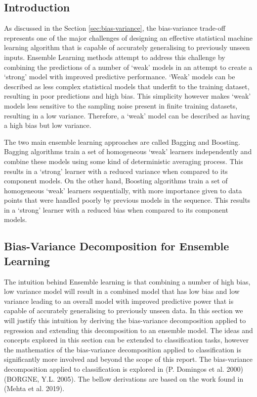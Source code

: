 \documentclass[../SMLreport_template.tex]{subfiles}
\begin{document}
\subsection{Introduction}
As discussed in the Section \ref{sec:bias-variance}, the bias-variance trade-off represents one of the major challenges of designing an effective statistical machine learning algorithm that is capable of accurately generalising to previously unseen inputs. Ensemble Learning methods attempt to address this challenge by combining the predictions of a number of ‘weak’ models in an attempt to create a ‘strong’ model with improved predictive performance. ‘Weak’ models can be described as less complex statistical models that underfit to the training dataset, resulting in poor predictions and high bias. This simplicity however makes ‘weak’ models less sensitive to the sampling noise present in finite training datasets, resulting in a low variance. Therefore, a ‘weak’ model can be described as having a high bias but low variance. \par\noindent
The two main ensemble learning approaches are called Bagging and Boosting. Bagging algorithms train a set of homogeneous ‘weak’ learners independently and combine these models using some kind of deterministic averaging process. This results in a ‘strong’ learner with a reduced variance when compared to its component models.  On the other hand, Boosting algorithms train a set of homogeneous ‘weak’ learners sequentially, with more importance given to data points that were handled poorly by previous models in the sequence. This results in a ‘strong’ learner with a reduced bias when compared to its component models.

\subsection{Bias-Variance Decomposition for Ensemble Learning}
The intuition behind Ensemble learning is that combining a number of high bias, low variance model will result in a combined model that has low bias and low variance leading to an overall model with improved predictive power that is capable of accurately generalising to previously unseen data. In this section we will justify this intuition by deriving the bias-variance decomposition applied to regression and extending this decomposition to an ensemble model. The ideas and concepts explored in this section can be extended to classification tasks, however the mathematics of the bias-variance decomposition applied to classification is significantly more involved and beyond the scope of this report. The bias-variance decomposition applied to classification is explored in (P. Domingos et al. 2000)(BORGNE, Y.L. 2005). The bellow derivations are based on the work found in (Mehta et al. 2019).
\end{document}
